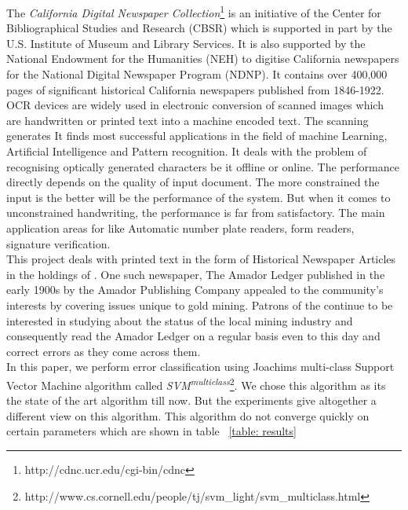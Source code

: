 \documentclass[letterpaper]{article}
\begin{document}
The \textit{California Digital Newspaper Collection}\footnote{http://cdnc.ucr.edu/cgi-bin/cdnc} is an initiative of the Center for Bibliographical Studies and Research (CBSR) which is supported in part by the U.S. Institute of Museum and Library Services. It is also supported by the National Endowment for the Humanities (NEH) to digitise California newspapers for the National Digital Newspaper Program (NDNP). It contains over 400,000 pages of significant historical California newspapers published from 1846-1922.\\
OCR devices are widely used in electronic conversion of scanned images which are handwritten or printed text into a machine encoded text. The scanning generates  It finds most successful applications in the field of machine Learning, Artificial Intelligence and Pattern recognition. It deals with the problem of recognising optically generated characters be it offline or online. The performance directly depends on the quality of input document. The more constrained the input is the better will be the performance of the system. But when it comes to unconstrained handwriting, the performance is far from satisfactory. The main application areas for \cite{OCR} like Automatic number plate readers, form readers, signature verification.\\
This project deals with printed text in the form of Historical Newspaper Articles in the holdings of \cite{cdnc}. One such newspaper, The Amador Ledger published in the early 1900s by the Amador Publishing Company appealed to the community's interests by covering issues unique to gold mining. Patrons of the \cite{cdnc} continue to be interested in studying about the status of the local mining industry and consequently read the Amador Ledger on a regular basis even to this day and correct \cite{OCR} errors as they come across them.\\
In this paper, we perform error classification using Joachims multi-class Support Vector Machine algorithm called \textit{SVM\textsuperscript{multiclass}}\footnote{http://www.cs.cornell.edu/people/tj/svm\_light/svm\_multiclass.html}. We chose this algorithm as its the state of the art algorithm till now. But the experiments give altogether a different view on this algorithm. This algorithm do not converge quickly on certain parameters which are shown in table ~\ref{table: results}



\end{document}
